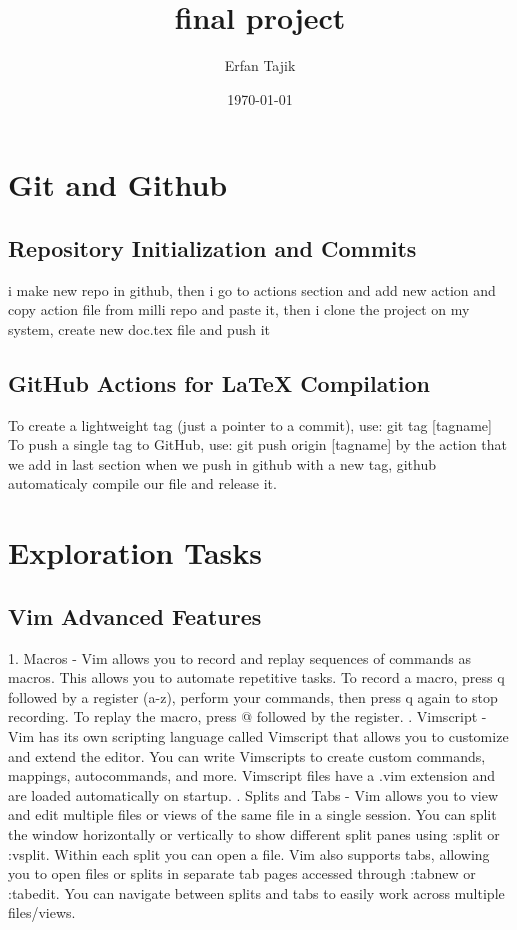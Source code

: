\documentclass [ titlepage ]{article}
\title{final project}
\author{Erfan Tajik}
\date{\today}
\begin{document}
\maketitle

\tableofcontents
\newpage

\section{Git and Github}
\subsection{ Repository Initialization and Commits}
i make new repo in github, then i go to actions section and add new action and copy action file from milli repo and paste it,
then i clone the project on my system, create new doc.tex file and push it

\subsection{GitHub Actions for LaTeX Compilation}
To create a lightweight tag (just a pointer to a commit), use: \newline
\textdollar git tag [tagname] \newline 
To push a single tag to GitHub, use: \newline
\textdollar git push origin [tagname] \newline
by the action that we add in last section when we push in github with a new tag, github automaticaly compile our file and release it.


\section{Exploration Tasks}
\subsection{ Vim Advanced Features}
1. Macros - Vim allows you to record and replay sequences of commands as macros. This allows you to automate repetitive tasks. To record a macro, press q followed by a register (a-z), perform your commands, then press q again to stop recording. To replay the macro, press @ followed by the register. \newline {}. Vimscript - Vim has its own scripting language called Vimscript that allows you to customize and extend the editor. You can write Vimscripts to create custom commands, mappings, autocommands, and more. Vimscript files have a .vim extension and are loaded automatically on startup. \newline {}. Splits and Tabs - Vim allows you to view and edit multiple files or views of the same file in a single session. You can split the window horizontally or vertically to show different split panes using :split or :vsplit. Within each split you can open a file. Vim also supports tabs, allowing you to open files or splits in separate tab pages accessed through :tabnew or :tabedit. You can navigate between splits and tabs to easily work across multiple files/views.
\end{document}
